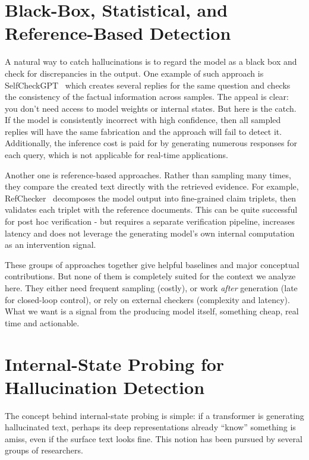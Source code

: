 \section{Black-Box, Statistical, and Reference-Based Detection}
\label{sec:lit_blackbox}

A natural way to catch hallucinations is to regard the model as a black box and check for discrepancies in the output. One example of such approach is SelfCheckGPT~\cite{manakul2023selfcheckgpt} which creates several replies for the same question and checks the consistency of the factual information across samples. The appeal is clear: you don’t need access to model weights or internal states. But here is the catch. If the model is consistently incorrect with high confidence, then all sampled replies will have the same fabrication and the approach will fail to detect it. Additionally, the inference cost is paid for by generating numerous responses for each query, which is not applicable for real-time applications.

Another one is reference-based approaches. Rather than sampling many times, they compare the created text directly with the retrieved evidence. For example, RefChecker~\cite{hu2024refchecker} decomposes the model output into fine-grained claim triplets, then validates each triplet with the reference documents. This can be quite successful for post hoc verification - but requires a separate verification pipeline, increases latency and does not leverage the generating model’s own internal computation as an intervention signal.

These groups of approaches together give helpful baselines and major conceptual contributions. But none of them is completely suited for the context we analyze here. They either need frequent sampling (costly), or work \emph{after} generation (late for closed-loop control), or rely on external checkers (complexity and latency). What we want is a signal from the producing model itself, something cheap, real time and actionable.

\section{Internal-State Probing for Hallucination Detection}
\label{sec:lit_probing}

The concept behind internal-state probing is simple: if a transformer is generating hallucinated text, perhaps its deep representations already “know” something is amiss, even if the surface text looks fine. This notion has been pursued by several groups of researchers.


